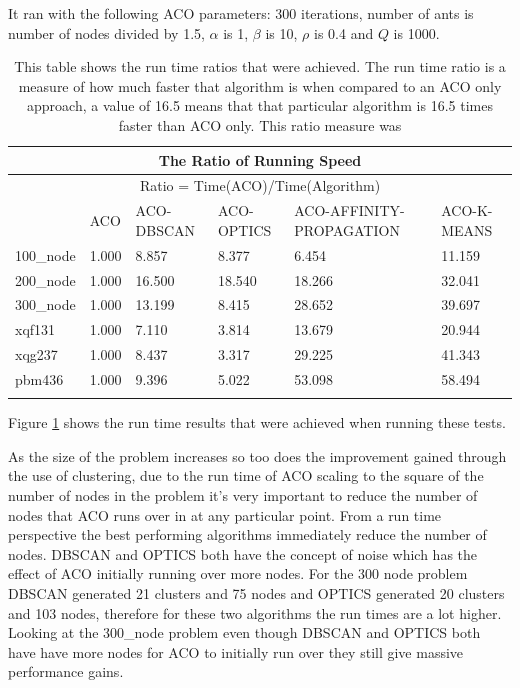 It ran with the following ACO parameters: 300 iterations, number of ants is number of nodes divided by 1.5, $\alpha$ is 1, $\beta$ is 10, $\rho$ is 0.4 and $Q$ is 1000.

\begin{longtable}[c]{|p{2cm}|p{1cm}|p{2cm}|p{2cm}|p{3cm}|p{2cm}|}
\hline
\multicolumn{6}{|c|}{The Ratio of Running Speed}                                     \\ \hline
\endhead
%
\multicolumn{6}{|c|}{Ratio = Time(ACO)/Time(Algorithm)}                              \\ \hline
          & ACO   & ACO-DBSCAN & ACO-OPTICS & ACO-AFFINITY-PROPAGATION & ACO-K-MEANS \\ \hline
100\_node & 1.000 & 8.857      & 8.377      & 6.454                    & 11.159      \\ \hline
200\_node & 1.000 & 16.500     & 18.540     & 18.266                   & 32.041      \\ \hline
300\_node & 1.000 & 13.199     & 8.415      & 28.652                   & 39.697      \\ \hline
xqf131    & 1.000 & 7.110      & 3.814      & 13.679                   & 20.944      \\ \hline
xqg237    & 1.000 & 8.437      & 3.317      & 29.225                   & 41.343      \\ \hline
pbm436    & 1.000 & 9.396      & 5.022      & 53.098                   & 58.494      \\ \hline
\caption{This table shows the run time ratios that were achieved. The run time ratio is a measure of how much faster that algorithm is when compared to an ACO only approach, a value of 16.5 means that that particular algorithm is 16.5 times faster than ACO only. This ratio measure was }
\label{tab:run_time_table_question_1}\\
\end{longtable}

Figure \ref{tab:run_time_table_question_1} shows the run time results that were achieved when running these tests.

As the size of the problem increases so too does the improvement gained through the use of clustering, due to the run time of ACO scaling to the square of the number of nodes in the problem it's very important to reduce the number of nodes that ACO runs over in at any particular point. From a run time perspective the best performing algorithms immediately reduce the number of nodes. DBSCAN and OPTICS both have the concept of noise which has the effect of ACO initially running over more nodes. For the 300 node problem DBSCAN generated 21 clusters and 75 nodes and OPTICS generated 20 clusters and 103 nodes, therefore for these two algorithms the run times are a lot higher. Looking at the 300\_node problem even though DBSCAN and OPTICS both have have more nodes for ACO to initially run over they still give massive performance gains.

